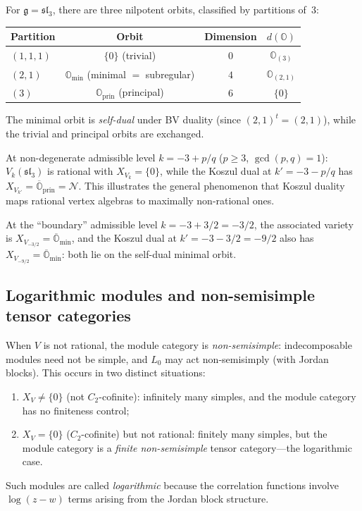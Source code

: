 \begin{example}
\label{ex:orbit-duality-sl3}
For $\mathfrak{g} = \mathfrak{sl}_3$, there are three nilpotent
orbits, classified by partitions of~$3$:
\begin{center}
\renewcommand{\arraystretch}{1.3}
\begin{tabular}{lccc}
\toprule
\textbf{Partition} & \textbf{Orbit} & \textbf{Dimension}
& $d(\mathbb{O})$ \\
\midrule
$(1,1,1)$ & $\{0\}$ (trivial) & $0$ & $\mathbb{O}_{(3)}$ \\
$(2,1)$ & $\mathbb{O}_{\min}$ (minimal $=$ subregular)
& $4$ & $\mathbb{O}_{(2,1)}$ \\
$(3)$ & $\mathbb{O}_{\mathrm{prin}}$ (principal)
& $6$ & $\{0\}$ \\
\bottomrule
\end{tabular}
\end{center}
The minimal orbit is \emph{self-dual} under BV duality
(since $(2,1)^t = (2,1)$), while the trivial and principal
orbits are exchanged.

At non-degenerate admissible level $k = -3 + p/q$ ($p \geq 3$,
$\gcd(p,q) = 1$):
$V_k(\mathfrak{sl}_3)$ is rational with
$X_{V_k} = \{0\}$, while the Koszul dual at
$k' = -3 - p/q$ has
$X_{V_{k'}} = \overline{\mathbb{O}}_{\mathrm{prin}} = \mathcal{N}$.
This illustrates the general phenomenon that Koszul duality maps
rational vertex algebras to maximally non-rational ones.

At the ``boundary'' admissible level
$k = -3 + 3/2 = -3/2$, the associated variety is
$X_{V_{-3/2}} = \overline{\mathbb{O}}_{\min}$, and the Koszul
dual at $k' = -3 - 3/2 = -9/2$ also has
$X_{V_{-9/2}} = \overline{\mathbb{O}}_{\min}$: both lie on the
self-dual minimal orbit.
\end{example}

\subsection{Logarithmic modules and non-semisimple tensor categories}
\label{sec:logarithmic-modules}

When $V$ is not rational, the module category is
\emph{non-semisimple}: indecomposable modules need not be
simple, and $L_0$ may act non-semisimply (with Jordan blocks).
This occurs in two distinct situations:
\begin{enumerate}[label=\textup{(\alph*)}]
\item $X_V \neq \{0\}$ (not $C_2$-cofinite): infinitely many
  simples, and the module category has no finiteness control;
\item $X_V = \{0\}$ ($C_2$-cofinite) but not rational:
  finitely many simples, but the module category is a
  \emph{finite non-semisimple} tensor category---the
  logarithmic case.
\end{enumerate}
Such modules are called \emph{logarithmic} because the
correlation functions involve $\log(z - w)$ terms arising from
the Jordan block structure.

